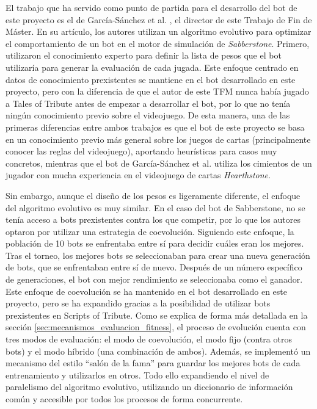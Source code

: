 El trabajo que ha servido como punto de partida para el desarrollo del bot de este proyecto es el de García-Sánchez et al. \cite{garcia-sanchez_optimizing_2020}, el director de este Trabajo de Fin de Máster. En su artículo, los autores utilizan un algoritmo evolutivo para optimizar el comportamiento de un bot en el motor de simulación de \textit{Sabberstone}. Primero, utilizaron el conocimiento experto para definir la lista de pesos que el bot utilizaría para generar la evaluación de cada jugada. Este enfoque centrado en datos de conocimiento prexistentes se mantiene en el bot desarrollado en este proyecto, pero con la diferencia de que el autor de este TFM nunca había jugado a Tales of Tribute antes de empezar a desarrollar el bot, por lo que no tenía ningún conocimiento previo sobre el videojuego. De esta manera, una de las primeras diferencias entre ambos trabajos es que el bot de este proyecto se basa en un conocimiento previo más general sobre los juegos de cartas (principalmente conocer las reglas del videojuego), aportando heurísticas para casos muy concretos, mientras que el bot de García-Sánchez et al. utiliza los cimientos de un jugador con mucha experiencia en el videojuego de cartas \textit{Hearthstone}.

Sin embargo, aunque el diseño de los pesos es ligeramente diferente, el enfoque del algoritmo evolutivo es muy similar. En el caso del bot de Sabberstone, no se tenía acceso a bots prexistentes contra los que competir, por lo que los autores optaron por utilizar una estrategia de coevolución. Siguiendo este enfoque, la población de 10 bots se enfrentaba entre sí para decidir cuáles eran los mejores. Tras el torneo, los mejores bots se seleccionaban para crear una nueva generación de bots, que se enfrentaban entre sí de nuevo. Después de un número específico de generaciones, el bot con mejor rendimiento se seleccionaba como el ganador. Este enfoque de coevolución se ha mantenido en el bot desarrollado en este proyecto, pero se ha expandido gracias a la posibilidad de utilizar bots prexistentes en Scripts of Tribute. Como se explica de forma más detallada en la sección \ref{sec:mecanismos_evaluacion_fitness}, el proceso de evolución cuenta con tres modos de evaluación: el modo de coevolución, el modo fijo (contra otros bots) y el modo híbrido (una combinación de ambos). Además, se implementó un mecanismo del estilo ``salón de la fama'' para guardar los mejores bots de cada entrenamiento y utilizarlos en otros. Todo ello expandiendo el nivel de paralelismo del algoritmo evolutivo, utilizando un diccionario de información común y accesible por todos los procesos de forma concurrente.

